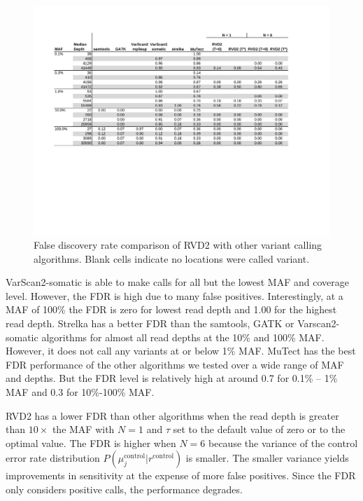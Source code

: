 \documentclass[11pt,reqno]{amsart}
\begin{document}
\begin{figure}[h]
\begin{center}
\includegraphics[width=160mm]{pdf_figs/comparison_table_fdr.pdf}
\caption{False discovery rate comparison of RVD2 with other variant calling algorithms. Blank cells indicate no locations were called variant.}
\label{tbl:comparison_fdr}
\end{center}
\end{figure}

VarScan2-somatic is able to make calls for all but the lowest MAF and coverage level. However, the FDR is high due to many false positives. Interestingly, at a MAF of 100\% the FDR is zero for lowest read depth and 1.00 for the highest read depth. Strelka has a better FDR than the samtools, GATK or Varscan2-somatic algorithms for almost all read depths at the 10\% and 100\% MAF. However, it does not call any variants at or below 1\% MAF.  MuTect has the best FDR performance of the other algorithms we tested over a wide range of MAF and depths. But the FDR level is relatively high at around 0.7 for 0.1\% -- 1\% MAF and 0.3 for 10\%-100\% MAF.
 
RVD2 has a lower FDR than other algorithms when the read depth is greater than $10\times$ the MAF with $N=1$ and $\tau$ set to the default value of zero or to the optimal value. The FDR is higher when $N=6$ because the variance of the control error rate distribution $P(\mu_j^{\text{control}} | r^{\text{control}})$ is smaller. The smaller variance yields improvements in sensitivity at the expense of more false positives. Since the FDR only considers positive calls, the performance degrades.
\end{document}
